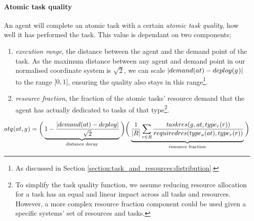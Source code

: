 \paragraph{Atomic task quality}
\label{section:atomic_task_quality}
\newcommand{\functionAtomicTaskQualitySymbol}[2]{\functionSymbol{atq_{#1}^{#2}}}
\newcommand{\functionAtomicTaskQualitySignature}[2]{
	\ifx&#1&
	\functionSignature{\functionAtomicTaskQualitySymbol{}{}} {\varAtomicTask{}{}, \varAgent{}{}}
	\else
	\functionSignature{\functionAtomicTaskQualitySymbol{}{}}{#1, #2}
	\fi
}
\newcommand{\functionAtomicTaskQualitySensor}[2]{
	\functionSignature{\functionAtomicTaskQualitySymbol{}{}} {\varAtomicTask{}{}, \functionDetectorRole{}{}}
}

An agent will complete an atomic task with a certain \textit{atomic task quality}, how well it has performed the task. This value is dependant on two components;
\begin{enumerate}
	\item \textit{execution range}, the distance between the agent and the demand point of the task. As the maximum distance between any agent and demand point in our normalised coordinate system is $\sqrt{2}$, we can scale $\funcSize{ \functionTaskDemandPoint{}{} - \functionSignature{deploy}{\varAgent{}{}}}$ to the range $\lbrack 0, 1 \rbrack$, ensuring the quality also stays in this range\footnote{As discussed in Section \ref{section:task_and_resources:distribution}.}.
	\item \textit{resource fraction}, the fraction of the atomic tasks' resource demand that the agent has actually dedicated to tasks of that type\footnote{To simplify the task quality function, we assume reducing resource allocation for a task has an equal and linear impact across all tasks and resources. However, a more complex resource fraction component could be used given a specific systems' set of resources and tasks.}.
\end{enumerate}

\begin{equation}
	\label{eq:atomic_task_quality}
	\functionAtomicTaskQualitySignature{}{} = 
\bigg (
\underbrace{
	1 - \frac{\funcSize{
			\functionTaskDemandPoint{}{} - \functionDeployment{}{} 
		}{}}{{\sqrt{2}}}
}_{\text{distance decay}}
\bigg )
\bigg (
\underbrace{
	\frac{1}{\funcSize{\setResource{}{}}}\sum_{\varResource{}{} \in \setResource{}{}} 
	\frac
	{\functionTaskResourceAllocationInstance{}{}}
	{\functionRequiredResourcesInstance{}{}}
}_{\text{resource fraction}}
\bigg )
\end{equation}

